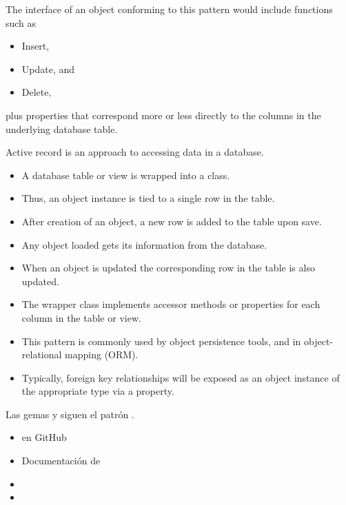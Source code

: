 The interface of an object conforming to
this pattern would include functions such as 
\begin{itemize}
\item
Insert, 
\item
Update, and 
\item
Delete,
\end{itemize}
plus properties that correspond more or less directly to the columns in
the underlying database table.

Active record is an approach to accessing data in a database. 

\begin{itemize}
\item
A database
table or view is wrapped into a class. 

\item
Thus, an object instance is tied
to a single row in the table. 

\item
After creation of an object, a new row is
added to the table upon save. 

\item
Any object loaded gets its information
from the database. 

\item
When an object is updated the corresponding row in
the table is also updated. 

\item
The wrapper class implements accessor methods
or properties for each column in the table or view.

\item
This pattern is commonly used by object persistence tools, and in
object-relational mapping (ORM). 

\item
Typically, foreign key relationships will
be exposed as an object instance of the appropriate type via a property.
\end{itemize}

Las gemas 
y \datamapper{} siguen el patrón .

\begin{itemize}
\item
{} en GitHub
\item
Documentación de 
\item
{}
\item
{}
\end{itemize}

